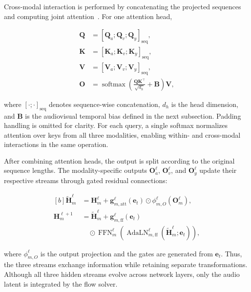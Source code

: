 Cross-modal interaction is performed by concatenating the projected sequences and computing joint attention~\cite{esser2024scaling}. For one attention head,

\begin{equation}
\begin{aligned}
\mathbf{Q}
&=
[\mathbf{Q}_a;\mathbf{Q}_v;\mathbf{Q}_y]_{\mathrm{seq}},\\
\mathbf{K}
&=
[\mathbf{K}_a;\mathbf{K}_v;\mathbf{K}_y]_{\mathrm{seq}},\\
\mathbf{V}
&=
[\mathbf{V}_a;\mathbf{V}_v;\mathbf{V}_y]_{\mathrm{seq}},\\
\mathbf{O}
&=
\operatorname{softmax}
\left(
\frac{\mathbf{Q}\mathbf{K}^{\top}}{\sqrt{d_h}}
+
\mathbf{B}
\right)\mathbf{V},
\end{aligned}
\label{eq:joint_attention}
\end{equation}

where \([\cdot;\cdot]_{\mathrm{seq}}\) denotes sequence-wise concatenation, \(d_h\) is the head dimension, and \(\mathbf{B}\) is the audiovisual temporal bias defined in the next subsection. Padding handling is omitted for clarity. For each query, a single softmax normalizes attention over keys from all three modalities, enabling within- and cross-modal interactions in the same operation.

After combining attention heads, the output is split according to the original sequence lengths. The modality-specific outputs \(\mathbf{O}_a^\ell\), \(\mathbf{O}_v^\ell\), and \(\mathbf{O}_y^\ell\) update their respective streams through gated residual connections:

\begin{equation}
\begin{aligned}[b]
\widetilde{\mathbf{H}}_m^\ell
&=
\mathbf{H}_m^\ell
+
\mathbf{g}_{m,\mathrm{att}}^\ell(\mathbf{e}_t)
\odot
\phi_{m,O}^\ell(\mathbf{O}_m^\ell),\\
\mathbf{H}_m^{\ell+1}
&=
\widetilde{\mathbf{H}}_m^\ell
+
\mathbf{g}_{m,\mathrm{ff}}^\ell(\mathbf{e}_t)
\\
&\quad\odot
\operatorname{FFN}_m^\ell
\left(
\operatorname{AdaLN}_{m,\mathrm{ff}}^\ell
(\widetilde{\mathbf{H}}_m^\ell;\mathbf{e}_t)
\right),
\end{aligned}
\label{eq:mm_residual}
\end{equation}

where \(\phi_{m,O}^\ell\) is the output projection and the gates are generated from \(\mathbf{e}_t\). Thus, the three streams exchange information while retaining separate transformations. Although all three hidden streams evolve across network layers, only the audio latent is integrated by the flow solver.

